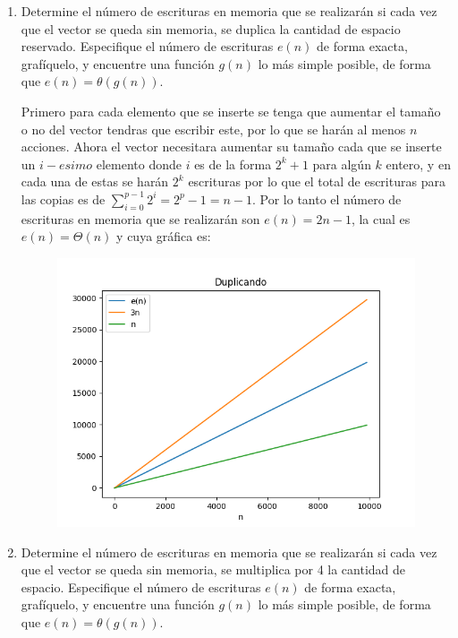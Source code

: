 \documentclass[letterpaper]{article}
\theoremstyle{definition}
\theoremstyle{lemathm}
\theoremstyle{lemathm}
\theoremstyle{lemathm}
\theoremstyle{lemademthm}
\newcommand{\pars}[1]{\left( #1 \right) }
\newcommand{\1}{\mathbbm{1}}
\begin{document}
\begin{enumerate}[label=\textbf{Problema \arabic*}]
\begin{enumerate}
			
            \item Determine el número de escrituras en memoria que se realizarán si cada vez que el vector se queda sin memoria, se duplica la cantidad de espacio reservado. Especifique el número de escrituras $e\pars{n}$ de forma exacta, grafíquelo, y encuentre una función $g\pars{n}$ lo más simple posible, de forma que $e\pars{n} = \theta\pars{g\pars{n}}$.
            
			Primero para cada elemento que se inserte se tenga que aumentar el tamaño o no del vector tendras que escribir este, por lo que se harán al menos $n$ acciones. Ahora el vector necesitara aumentar su tamaño cada que se inserte un $i-esimo$ elemento donde $i$ es de la forma $2^k + 1$ para algún $k$ entero, y en cada una de estas se harán $2^k$ escrituras por lo que el total de escrituras para las copias es de $\sum_{i=0}^{p-1} 2^i = 2^{p}-1 = n-1$. Por lo tanto el número de escrituras en memoria que se realizarán son $e\pars{n} = 2n-1$, la cual es $e\pars{n} = \Theta(n)$ y cuya gráfica es:
			
			\begin{figure}[H]
				\begin{center}
					\includegraphics[scale=0.80]{Images/Duplicando.png}
				\end{center}
			\end{figure}
			
			\newpage

            \item Determine el número de escrituras en memoria que se realizarán si cada vez que el vector se queda sin memoria, se multiplica por 4 la cantidad de espacio. Especifique el número de escrituras $e\pars{n}$ de forma exacta, grafíquelo, y encuentre una función $g\pars{n}$ lo más simple posible, de forma que $e\pars{n} = \theta\pars{g\pars{n}}$.
            

\end{enumerate}
\end{enumerate}
\end{document}
